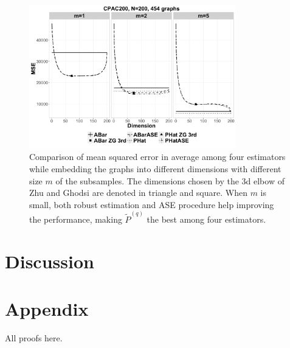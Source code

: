 \documentclass[a4paper]{article}
\begin{document}
\begin{figure}
\centering
\includegraphics[width=0.8\textwidth]{CPAC200.png}
\caption{Comparison of mean squared error in average among four estimators while embedding the graphs into different dimensions with different size $m$ of the subsamples. The dimensions chosen by the 3d elbow of Zhu and Ghodsi are denoted in triangle and square. When $m$ is small, both robust estimation and ASE procedure help improving the performance, making $\widetilde{P}^{(q)}$ the best among four estimators.}
\label{fig:CPAC200}
\end{figure}





\section{Discussion}


\section{Appendix}

All proofs here.



{}

\end{document}
